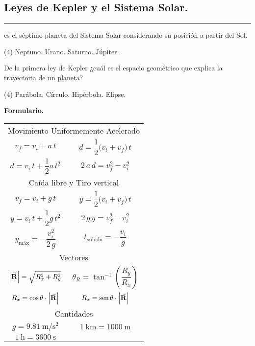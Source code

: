 \documentclass[12pt, letter]{exam}
\begin{document}
\begin{questions}
    \section{Leyes de Kepler y el Sistema Solar.}
    
    \question \rule{2cm}{0.1mm} es el séptimo planeta del Sistema Solar considerando su posición a partir del Sol.
    \begin{tasks}(4)
        \task Neptuno.
        \task Urano.
        \task Saturno.
        \task Júpiter.
    \end{tasks}
    \question De la primera ley de Kepler ¿cuál es el espacio geométrico que explica la trayectoria de un planeta?
    \begin{tasks}(4)
        \task Parábola.
        \task Círculo.
        \task Hipérbola.
        \task Elipse.
    \end{tasks}
    
\end{questions}

\newpage

\textbf{\huge{Formulario.}}
\begin{table}[H]
    \centering
    \setlength{\tabcolsep}{40pt}
    \renewcommand{\arraystretch}{2.5}
    \begin{tabular}{c  c}
        \multicolumn{2}{c}{Movimiento Uniformemente Acelerado} \\
        $v_{f} = v_{i} + a \, t$ & $d = \dfrac{1}{2} \big( v_{i} + v_{f} \big) \, t$ \\
        $d = v_{i} \, t + \dfrac{1}{2} a \, t^{2}$ & $2 \, a \, d = v_{f}^{2} - v_{i}^{2}$ \\ \hline
        \multicolumn{2}{c}{Caída libre y Tiro vertical} \\
        $v_{f} = v_{i} + g \, t$ & $y = \dfrac{1}{2} \big( v_{i} + v_{f} \big) \, t$ \\
        $y = v_{i} \, t + \dfrac{1}{2} g \, t^{2}$ & $2 \, g \, y = v_{f}^{2} - v_{i}^{2}$ \\ 
        $y_{\text{máx}} = - \dfrac{v_{i}^{2}}{2 \, g}$ & $t_{\text{subida}} = - \dfrac{v_{i}}{g}$ \\ \hline
        \multicolumn{2}{c}{Vectores} \\
        $\abs{\va{R}} = \sqrt{R_{x}^{2} + R_{y}^{2}}$ & $\theta_{R} = \tan^{-1} \left( \dfrac{R_{y}}{R_{x}} \right)$ \\
        $R_{x} = \cos \theta \cdot \abs{\va{R}}$ & $R_{x} = \text{sen} \, \theta \cdot \abs{\va{R}}$ \\ \hline
        \multicolumn{2}{c}{Cantidades} \\
        $g = \SI{9.81}{\meter\per\square\second}$ & $\SI{1}{\kilo\meter} = \SI{1000}{\meter}$  \\
        $\SI{1}{\hour} = \SI{3600}{\second}$ &
\end{tabular}
\end{table}
\end{document}

